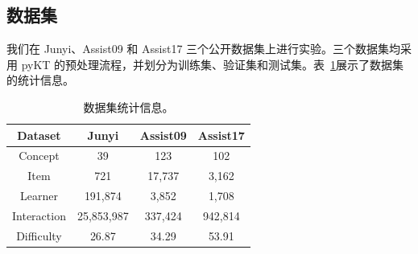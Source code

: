 \documentclass[UTF8,a4paper,zihao=5,twocolumn]{ctexart}
\begin{document}
\subsection{数据集}
我们在 Junyi、Assist09 和 Assist17 三个公开数据集上进行实验。三个数据集均采用 pyKT 的预处理流程，并划分为训练集、验证集和测试集\cite{LiuGL2025}。表~\ref{tab:datasets}展示了数据集的统计信息。
\begin{table}[H]
\centering
\captionsetup{labelfont=bf,textfont=bf}
\caption{数据集统计信息。}
\label{tab:datasets}
\setlength{\tabcolsep}{4pt}
\footnotesize
\begin{tabular}{cccc}
\toprule
\textbf{Dataset} & \textbf{Junyi} & \textbf{Assist09} & \textbf{Assist17}  \\
\midrule
Concept & 39 & 123 & 102 \\
Item & 721 & 17,737 & 3,162 \\
Learner & 191,874 & 3,852 & 1,708 \\
Interaction & 25,853,987 & 337,424 & 942,814 \\
Difficulty & 26.87 & 34.29 & 53.91 \\
\bottomrule
\end{tabular}
\end{table}
\end{document}
